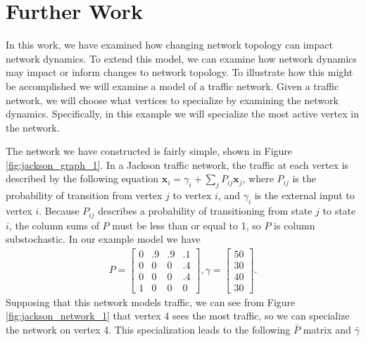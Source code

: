 \documentclass[12pt]{thesis}
\begin{document}
\chapter{Further Work}\label{chapt:further_work}
In this work, we have examined how changing network topology can impact network dynamics.
To extend this model, we can examine how network dynamics may impact or inform changes to network topology.
To illustrate how this might be accomplished we will examine a model of a traffic network. Given a traffic network, we will choose what vertices to specialize by examining the network dynamics.
Specifically, in this example we will specialize the most active vertex in the network.

The network we have constructed is fairly simple, shown in Figure \ref{fig:jackson_graph_1}.
In a Jackson traffic network, the traffic at each vertex is described by the following equation $\mathbf{x}_i = \gamma_i + \sum_{j}P_{ij}\mathbf{x}_j$, where $P_{ij}$ is the probability of transition from vertex $j$ to vertex $i$, and $\gamma_i$ is the external input to vertex $i$.
Because $P_{ij}$ describes a probability of transitioning from state $j$ to state $i$, the column sums of $P$ must be less than or equal to 1, so $P$ is column substochastic.
In our example model we have 
\begin{align*}
    P =
    \begin{bmatrix}
        0  & .9  & .9  & .1 \\
        0  &  0  &  0  & .4 \\
        0  &  0  &  0  & .4 \\
        1  &  0  &  0  &  0
    \end{bmatrix},
    \gamma = \begin{bmatrix} 50 \\ 30 \\ 40 \\ 30 \end{bmatrix}.
\end{align*}
Supposing that this network models traffic, we can see from Figure \ref{fig:jackson_network_1} that vertex 4 sees the most traffic, so we can specialize the network on vertex 4. This specialization leads to the following $\bar{P}$ matrix and $\bar{\gamma}$
\end{document}
